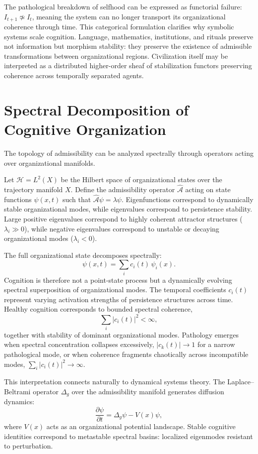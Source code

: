 \documentclass[12pt,a4paper]{report}
\theoremstyle{flyxion}
\begin{document}
The pathological breakdown of selfhood can be expressed as functorial failure: $I_{t+1} \not\simeq I_t$, meaning the system can no longer transport its organizational coherence through time. This categorical formulation clarifies why symbolic systems scale cognition. Language, mathematics, institutions, and rituals preserve not information but morphism stability: they preserve the existence of admissible transformations between organizational regions. Civilization itself may be interpreted as a distributed higher-order sheaf of stabilization functors preserving coherence across temporally separated agents.


\chapter{Spectral Decomposition of Cognitive Organization}

The topology of admissibility can be analyzed spectrally through operators acting over organizational manifolds.

Let $\mathcal{H} = L^2(X)$ be the Hilbert space of organizational states over the trajectory manifold $X$. Define the admissibility operator $\hat{\mathcal{A}}$ acting on state functions $\psi(x,t)$ such that $\hat{\mathcal{A}}\psi = \lambda\psi$. Eigenfunctions correspond to dynamically stable organizational modes, while eigenvalues correspond to persistence stability. Large positive eigenvalues correspond to highly coherent attractor structures ($\lambda_i \gg 0$), while negative eigenvalues correspond to unstable or decaying organizational modes ($\lambda_i < 0$).

The full organizational state decomposes spectrally:
\[
\psi(x,t) = \sum_i c_i(t)\,\psi_i(x).
\]
Cognition is therefore not a point-state process but a dynamically evolving spectral superposition of organizational modes. The temporal coefficients $c_i(t)$ represent varying activation strengths of persistence structures across time. Healthy cognition corresponds to bounded spectral coherence,
\[
\sum_i |c_i(t)|^2 < \infty,
\]
together with stability of dominant organizational modes. Pathology emerges when spectral concentration collapses excessively, $|c_k(t)| \rightarrow 1$ for a narrow pathological mode, or when coherence fragments chaotically across incompatible modes, $\sum_i |c_i(t)|^2 \rightarrow \infty$.

This interpretation connects naturally to dynamical systems theory. The Laplace--Beltrami operator $\Delta_g$ over the admissibility manifold generates diffusion dynamics:
\[
\frac{\partial\psi}{\partial t} = \Delta_g\psi - V(x)\psi,
\]
where $V(x)$ acts as an organizational potential landscape. Stable cognitive identities correspond to metastable spectral basins: localized eigenmodes resistant to perturbation.
\end{document}
